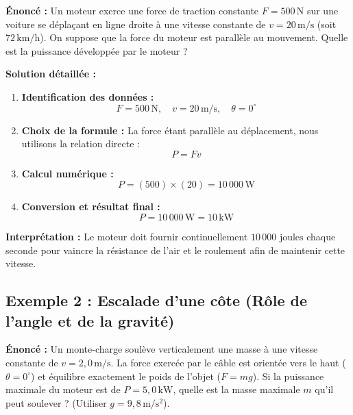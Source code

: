 \documentclass[11pt,openany]{book}
\begin{document}
\noindent\textbf{Énoncé :} Un moteur exerce une force de traction constante $F = \mathrm{500\,N}$ sur une voiture se déplaçant en ligne droite à une vitesse constante de $v = \mathrm{20\,m/s}$ (soit $72\,\mathrm{km/h}$). On suppose que la force du moteur est parallèle au mouvement. Quelle est la puissance développée par le moteur ?

\vspace{0.2cm}

\noindent\textbf{Solution détaillée :}

\begin{enumerate}
    \item \textbf{Identification des données :}
    \[
    F = \mathrm{500\,N}, \quad v = \mathrm{20\,m/s}, \quad \theta = 0^\circ
    \]
    
    \item \textbf{Choix de la formule :}
    La force étant parallèle au déplacement, nous utilisons la relation directe :
    \[
    P = F v
    \]

    \item \textbf{Calcul numérique :}
    \[
    P = (500) \times (20) = 10\,000\,\mathrm{W}
    \]

    \item \textbf{Conversion et résultat final :}
    \[
    \boxed{P = \mathrm{10\,000\,W = 10\,kW}}
    \]
\end{enumerate}

\noindent\textbf{Interprétation :} Le moteur doit fournir continuellement $10\,000\text{ joules}$ chaque seconde pour vaincre la résistance de l'air et le roulement afin de maintenir cette vitesse.

\vspace{0.4cm}

\subsection*{Exemple 2 : Escalade d'une côte (Rôle de l'angle et de la gravité)}

\noindent\textbf{Énoncé :} Un monte-charge soulève verticalement une masse à une vitesse constante de $v = \mathrm{2{,}0\,m/s}$. La force exercée par le câble est orientée vers le haut ($\theta = 0^\circ$) et équilibre exactement le poids de l'objet ($F = mg$). Si la puissance maximale du moteur est de $P = \mathrm{5{,}0\,kW}$, quelle est la masse maximale $m$ qu'il peut soulever ? (Utiliser $g = \mathrm{9{,}8\,m/s^2}$).

\vspace{0.2cm}
\end{document}
